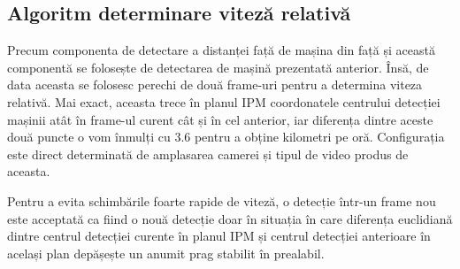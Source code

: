 \subsection*{Algoritm determinare viteză relativă}

Precum componenta de detectare a distanței față de mașina din față și această componentă se folosește de detectarea de mașină prezentată anterior. Însă, de data aceasta se folosesc perechi de două frame-uri pentru a determina viteza relativă. Mai exact, aceasta trece în planul IPM coordonatele centrului detecției mașinii atât în frame-ul curent cât și în cel anterior, iar diferența dintre aceste două puncte o vom înmulți cu 3.6 pentru a obține kilometri pe oră. Configurația este direct determinată de amplasarea camerei și tipul de video produs de aceasta. 

Pentru a evita schimbările foarte rapide de viteză, o detecție într-un frame nou este acceptată ca fiind o nouă detecție doar în situația în care diferența euclidiană dintre centrul detecției curente în planul IPM și centrul detecției anterioare în același plan depășește un anumit prag stabilit în prealabil.